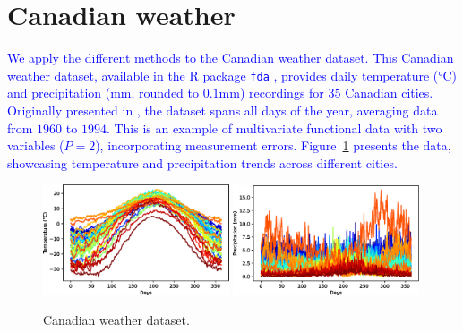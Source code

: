
\section{Canadian weather} %
\label{sec:canadian_weather}


\textcolor{blue}{We apply the different methods to the Canadian weather dataset. This Canadian weather dataset, available in the R package \texttt{fda} \cite{ramsayFdaFunctionalData2023}, provides daily temperature (°C) and precipitation (mm, rounded to $0.1$mm) recordings for $35$ Canadian cities. Originally presented in \cite{ramsayFunctionalDataAnalysis2005}, the dataset spans all days of the year, averaging data from $1960$ to $1994$. This is an example of multivariate functional data with two variables ($P = 2$), incorporating measurement errors. Figure~\ref{fig:canadian_weather} presents the data, showcasing temperature and precipitation trends across different cities.}
\begin{figure}
    \centering
    \includegraphics[width=0.49\textwidth]{figures/temperature.eps}
    \includegraphics[width=0.49\textwidth]{figures/precipitation.eps}
    \caption{Canadian weather dataset.}
    \label{fig:canadian_weather}
\end{figure}

